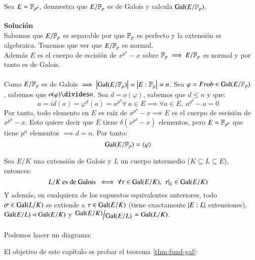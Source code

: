 \begin{ex}[H4.2]
    Sea $E = \mathbb{F}_{p^n}$, demuestra que $E / \mathbb{F}_p$ es de Galois y calcula $\mathrm{Gal}(E / \mathbb{F}_p)$.\\\\

    \textbf{Solución}\\
    Sabemos que $E / \mathbb{F}_p$ es separable por que $\mathbb{F}_p$ es perfecto y la extensión es algebraica. Tenemos que ver que $E / \mathbb{F}_p$ es normal.\\
    Además $E$ es el cuerpo de escisión de $x^{p^n} - x$ sobre $\mathbb{F}_p \implies E / \mathbb{F}_p$ es normal y por tanto es de Galois.\\\\
    Como $E / \mathbb{F}_p$ es de Galois $\implies \left|\mathrm{Gal}(E / \mathbb{F}_p)\right| = \left|E : \mathbb{F}_p\right| = n$. Sea $\varphi = Frob \in \mathrm{Gal}(E / \mathbb{F}_p)$, sabemos que $o(\varphi) \divides n$.
    Sea $d = o(\varphi)$, sabemos que $d \leq n$ y que:
    $$
        a = id(a) = \varphi^d(a) = a^{p^d} \forall\ a \in E \implies \forall a \in E,\ a^{p^d} - a = 0
    $$
    Por tanto, todo elemento en $E$ es raíz de $x^{p^d} - x \implies E$ es el cuerpo de escisión de $x^{p^d} - x$. Esto quiere decir que $E$ tiene $\delta(x^{p^d} - x)$ elementos, pero $E = \mathbb{F}_{p^n}$ que tiene $p^n$ elementos $\implies d = n$. Por tanto:
    $$
        \mathrm{Gal}(E / \mathbb{F}_p) = \langle\varphi\rangle
    $$
\end{ex}

\begin{cor} %
    Sea $E/K$ una extensión de Galois y $L$ un cuerpo intermedio ($K \subseteq L \subseteq E$), entonces:
    $$
        L/K \text{ es de Galois } \iff \forall \tau \in \mathrm{Gal}(E/K),\ \left.\tau\right|_L \in \mathrm{Gal}(E/K)
    $$
    Y además, en cualquiera de los supuestos equivalentes anteriores, todo $\sigma \in \mathrm{Gal}(L/K)$ se extiende a $\tau \in \mathrm{Gal}(E/K)$ (tiene exactamente $\left|E:L\right|$ extensiones), $\mathrm{Gal}(E/L) \lhd \mathrm{Gal}(E/K)$ y $ \quo{\gal(E/K)}{\gal(E/L)} \isom \gal(L/K)$.\\\\
    Podemos hacer un diagrama:
\end{cor}

El objetivo de este capítulo es probar el teorema \ref{thm:fund-gal}:

